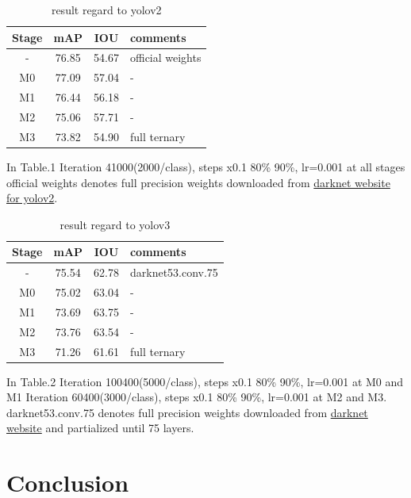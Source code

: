 \documentclass[10pt,a4paper,twocolumn]{article}
\begin{document}
\begin{table}[htbp]
 \centering
 \begin{tabular}{c|c|c|l}
  Stage & mAP & IOU & comments \\ \hline\hline
  -        & 76.85 & 54.67 & official weights \\ \hline
  M0       & 77.09 & 57.04 & -                \\ \hline
  M1       & 76.44 & 56.18 & -                \\ \hline
  M2       & 75.06 & 57.71 & -                \\ \hline
  M3       & 73.82 & 54.90 & full ternary     \\ \hline\hline
 \end{tabular}
 \caption{result regard to yolov2}
 \label{tb:yolov2}
\end{table}

In Table.1 Iteration 41000(2000/class), steps x0.1 80\% 90\%, lr=0.001 at all stages
official weights denotes full precision weights downloaded from \href{https://pjreddie.com/darknet/yolov2}{darknet website for yolov2}.

\begin{table}[htbp]
 \centering
 \begin{tabular}{c|c|c|l}
  Stage & mAP & IOU & comments \\ \hline\hline
  -        & 75.54 & 62.78 & darknet53.conv.75 \\ \hline
  M0       & 75.02 & 63.04 & -                \\ \hline
  M1       & 73.69 & 63.75 & -                \\ \hline
  M2       & 73.76 & 63.54 & -                \\ \hline
  M3       & 71.26 & 61.61 & full ternary     \\ \hline\hline
 \end{tabular}
 \caption{result regard to yolov3}
 \label{tb:yolov3}
\end{table}

In Table.2 Iteration 100400(5000/class), steps x0.1 80\% 90\%, lr=0.001 at M0 and M1
Iteration 60400(3000/class), steps x0.1 80\% 90\%, lr=0.001 at M2 and M3.
darknet53.conv.75 denotes full precision weights downloaded from \href{https://pjreddie.com/darknet/yolo}{darknet website} and partialized until 75 layers.

\section{Conclusion}
\end{document}
